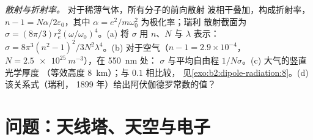 \begin{exercise}[$\star\star\star$]\label{exo:b2:dipole-radiation:12}
\emph{散射与折射率。} 对于稀薄气体，所有分子的前向散射
波相干叠加，构成折射率，
$n - 1 = N\alpha/2\varepsilon_0$，其中 $\alpha = e^2/m\omega_0^2$ 为极化率；瑞利
散射截面为 $\sigma = (8\pi/3)r_e^2(\omega/\omega_0)^4$。(a) 将
$\sigma$ 用 $n$、$N$ 与 $\lambda$ 表示：$\sigma = 8\pi^3(n^2 - 1)^2/3N^2\lambda^4$。(b)
对于空气（$n - 1 = 2.9 \times 10^{-4}$，$N = \qty{2.5e25}{m^{-3}}$），在 \qty{550}{nm} 处：
$\sigma$ 与平均自由程 $1/N\sigma$。(c) 大气的竖直光学厚度
（等效高度 \qty{8}{km}）；与 $0.1$ 相比较，
见\cref{exo:b2:dipole-radiation:8}。(d) 该关系式（瑞利，
1899 年）给出阿伏伽德罗常数的值？
\end{exercise}

\section{问题：天线塔、天空与电子}

